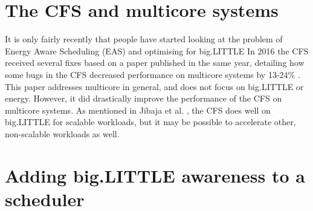 \section{The CFS and multicore systems}
It is only fairly recently that people have started looking at the problem of
Energy Aware Scheduling (EAS) and optimising for big.LITTLE  In 2016 the CFS
received several fixes based on a paper published in the same year, detailing
how some bugs in the CFS decreased performance on multicore systems by 13-24\%
\cite{lozi_linux_2016}. This paper addresses multicore in general, and does not
focus on big.LITTLE or energy. However, it did drastically improve the
performance of the CFS on multicore systems. As mentioned in Jibaja et al.
\cite{jibaja_portable_2016}, the CFS does well on big.LITTLE for scalable
workloads, but it may be possible to accelerate other, non-scalable workloads as
well.

\section{Adding big.LITTLE awareness to a scheduler}
